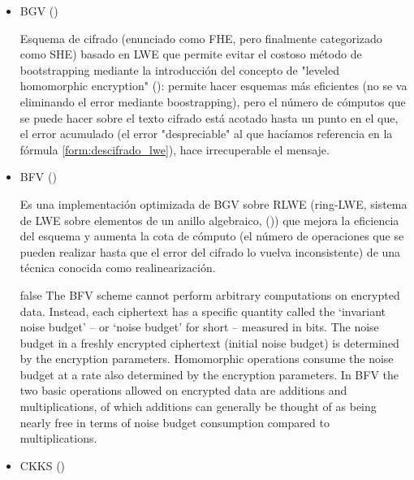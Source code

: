 \begin{itemize}

    \item BGV (\cite{brakerski_leveled_2012})

    Esquema de cifrado (enunciado como FHE, pero finalmente categorizado como SHE) basado en LWE que permite evitar el costoso método de bootstrapping mediante la introducción del concepto de "leveled homomorphic encryption" (\cite{noauthor_homomorphic_nodate-3}): permite hacer esquemas más eficientes (no se va eliminando el error mediante boostrapping), pero el número de cómputos que se puede hacer sobre el texto cifrado está acotado hasta un punto en el que, el error acumulado (el error "despreciable" al que hacíamos referencia en la fórmula \ref{form:descifrado_lwe}), hace irrecuperable el mensaje.
    

    \item BFV (\cite{fan_somewhat_2012})

    Es una implementación optimizada de BGV sobre RLWE (ring-LWE, sistema de LWE sobre elementos de un anillo algebraico, (\cite{wikipedia_contributors._anillo_2019})) que mejora la eficiencia del esquema y aumenta la cota de cómputo (el número de operaciones que se pueden realizar hasta que el error del cifrado lo vuelva inconsistente) de una técnica conocida como realinearización.

    \if false
    The BFV scheme cannot perform arbitrary computations on encrypted data.
        Instead, each ciphertext has a specific quantity called the `invariant noise
        budget' -- or `noise budget' for short -- measured in bits. The noise budget
        in a freshly encrypted ciphertext (initial noise budget) is determined by
        the encryption parameters. Homomorphic operations consume the noise budget
        at a rate also determined by the encryption parameters. In BFV the two basic
        operations allowed on encrypted data are additions and multiplications, of
        which additions can generally be thought of as being nearly free in terms of
        noise budget consumption compared to multiplications.
    \fi


    \item CKKS (\cite{cheon_homomorphic_2017})
    \label{tag:ckks}
    

\end{itemize}
